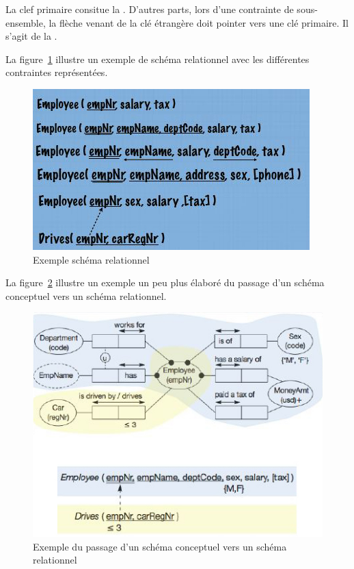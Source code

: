 La clef primaire consitue la .
D'autres parts, lors d'une contrainte de sous-ensemble,
la flèche venant de la clé étrangère doit pointer vers une clé primaire.
Il s'agit de la .

La figure~\ref{schema_relationnel} illustre un exemple de schéma relationnel
avec les différentes contraintes représentées.
\begin{figure}[h]
  \centering
  \includegraphics[scale=0.9]{schema_relationnel.jpg}
  \caption{Exemple schéma relationnel}
  \label{schema_relationnel}
\end{figure}

La figure~\ref{conceptuel_to_relationnel} illustre un exemple un peu plus
élaboré du passage d'un schéma conceptuel vers un schéma relationnel.
\begin{figure}[ht]
  \centering
  \includegraphics[scale=1]{conceptuel_to_relationnel.jpg}
  \caption{Exemple du passage d'un schéma conceptuel vers un schéma relationnel}
  \label{conceptuel_to_relationnel}
\end{figure}


